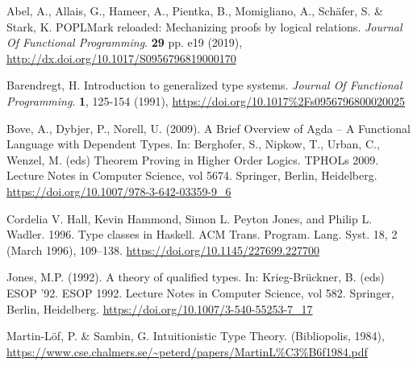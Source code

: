 
Abel, A., Allais, G., Hameer, A., Pientka, B., Momigliano, A., Schäfer, S. \& Stark, K. POPLMark reloaded: Mechanizing proofs by logical relations. {\em Journal Of Functional Programming}. \textbf{29} pp. e19 (2019), \url{http://dx.doi.org/10.1017/S0956796819000170}

 Barendregt, H. Introduction to generalized type systems. {\em Journal Of Functional Programming}. \textbf{1}, 125-154 (1991), \url{https://doi.org/10.1017%2Fs0956796800020025}

 Bove, A., Dybjer, P., Norell, U. (2009). A Brief Overview of Agda – A Functional Language with Dependent Types. In: Berghofer, S., Nipkow, T., Urban, C., Wenzel, M. (eds) Theorem Proving in Higher Order Logics. TPHOLs 2009. Lecture Notes in Computer Science, vol 5674. Springer, Berlin, Heidelberg. \url{https://doi.org/10.1007/978-3-642-03359-9_6}

 Cordelia V. Hall, Kevin Hammond, Simon L. Peyton Jones, and Philip L. Wadler. 1996. Type classes in Haskell. ACM Trans. Program. Lang. Syst. 18, 2 (March 1996), 109–138. \url{https://doi.org/10.1145/227699.227700}

 Jones, M.P. (1992). A theory of qualified types. In: Krieg-Brückner, B. (eds) ESOP '92. ESOP 1992. Lecture Notes in Computer Science, vol 582. Springer, Berlin, Heidelberg. \url{https://doi.org/10.1007/3-540-55253-7_17}

 Martin-Löf, P. \& Sambin, G. Intuitionistic Type Theory. (Bibliopolis, 1984), \url{https://www.cse.chalmers.se/~peterd/papers/MartinL%C3%B6f1984.pdf}

